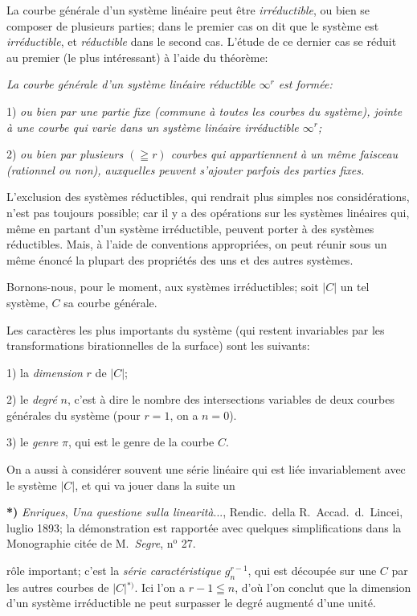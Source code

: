 \documentclass{article}
\begin{document}
La courbe générale d'un système linéaire peut être \emph{irréductible}, ou bien se composer de plusieurs parties; dans le premier cas on dit que le système est \emph{irréductible}, et \emph{réductible} dans le second cas. L'étude de ce dernier cas se réduit au premier (le plus intéressant) à l'aide du théorème:

\emph{La courbe générale d'un système linéaire réductible $\infty^{r}$ est formée:}

1) \emph{ou bien par une partie fixe (commune à toutes les courbes du système), jointe à une courbe qui varie dans un système linéaire irréductible $\infty^{r}$;}

2) \emph{ou bien par plusieurs $(\geqq r)$ courbes qui appartiennent à un même faisceau (rationnel ou non), auxquelles peuvent s'ajouter parfois des parties fixes.}

L'exclusion des systèmes réductibles, qui rendrait plus simples nos considérations, n'est pas toujours possible; car il y a des opérations sur les systèmes linéaires qui, même en partant d'un système irréductible, peuvent porter à des systèmes réductibles. Mais, à l'aide de conventions appropriées, on peut réunir sous un même énoncé la plupart des propriétés des uns et des autres systèmes.

Bornons-nous, pour le moment, aux systèmes irréductibles; soit $|C|$ un tel système, $C$ sa courbe générale.

Les caractères les plus importants du système (qui restent invariables par les transformations birationnelles de la surface) sont les suivants:

1) la \emph{dimension} $r$ de $|C|$;

2) le \emph{degré} $n$, c'est à dire le nombre des intersections variables de deux courbes générales du système (pour $r = 1$, on a $n = 0$).

3) le \emph{genre} $\pi$, qui est le genre de la courbe $C$.

On a aussi à considérer souvent une série linéaire qui est liée invariablement avec le système $|C|$, et qui va jouer dans la suite un

\textbf{*)} \emph{Enriques}, \emph{Una questione sulla linearità}..., Rendic.\ della R.\ Accad.\ d.\ Lincei, luglio 1893; la démonstration est rapportée avec quelques simplifications dans la Monographie citée de M.\ \emph{Segre}, n${}^{\text{o}}$ 27.

rôle important; c'est la \emph{série caractéristique $g_{n}^{r-1}$}, qui est découpée sur une $C$ par les autres courbes de $|C|$${}^{*)}$. Ici l'on a $r - 1 \leqq n$, d'où l'on conclut que la dimension d'un système irréductible ne peut surpasser le degré augmenté d'une unité.
\end{document}
